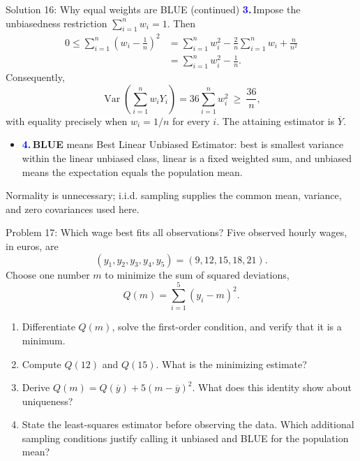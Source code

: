 \documentclass[notes,10pt, aspectratio=169]{beamer}
\newcommand{\Var}{\operatorname{Var}}
\newcommand{\answerpart}[1]{\textcolor{blue}{\textbf{#1.}}\,}
\begin{document}
\begin{frame}{Solution 16: Why equal weights are BLUE (continued)}
\small
\answerpart{3}Impose the unbiasedness restriction $\sum_{i=1}^n w_i=1$. Then
\[
\begin{aligned}
0\leq\sum_{i=1}^n\left(w_i-\frac1n\right)^2
&=\sum_{i=1}^n w_i^2-\frac2n\sum_{i=1}^n w_i+\frac{n}{n^2}\\
&=\sum_{i=1}^n w_i^2-\frac1n.
\end{aligned}
\]
Consequently,
\[
\Var\left(\sum_{i=1}^n w_iY_i\right)=36\sum_{i=1}^n w_i^2
\ \geq\ \frac{36}{n},
\]
with equality precisely when $w_i=1/n$ for every $i$. The attaining estimator is $\overline Y$.
\begin{itemize}
\setlength{\itemsep}{4pt}
\item \answerpart{4}\textbf{BLUE} means Best Linear Unbiased Estimator: best is smallest variance within the linear unbiased class, linear is a fixed weighted sum, and unbiased means the expectation equals the population mean.
\end{itemize}
Normality is unnecessary; i.i.d. sampling supplies the common mean, variance, and zero covariances used here.
\end{frame}
\fi

\begin{frame}{Problem 17: Which wage best fits all observations?}
Five observed hourly wages, in euros, are
\[
(y_1,y_2,y_3,y_4,y_5)=(9,12,15,18,21).
\]
Choose one number $m$ to minimize the sum of squared deviations,
\[
Q(m)=\sum_{i=1}^{5}(y_i-m)^2.
\]
\begin{enumerate}
\setlength{\itemsep}{7pt}
\item Differentiate $Q(m)$, solve the first-order condition, and verify that it is a minimum.
\item Compute $Q(12)$ and $Q(15)$. What is the minimizing estimate?
\item Derive $Q(m)=Q(\overline y)+5(m-\overline y)^2$. What does this identity show about uniqueness?
\item State the least-squares estimator before observing the data. Which additional sampling conditions justify calling it unbiased and BLUE for the population mean?
\end{enumerate}
\end{frame}
\end{document}
